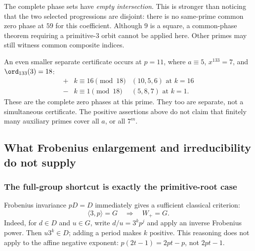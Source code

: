 \documentclass[11pt,a4paper]{article}
\theoremstyle{definition}\newtheorem{definition}[theorem]{Definition}
\theoremstyle{remark}\newtheorem{remark}[theorem]{Remark}
\begin{document}
The complete phase sets have \emph{empty intersection}. This is stronger
than noticing that the two selected progressions are disjoint: there is no
same-prime common zero phase at $59$ for this coefficient. Although $9$ is
a square, a common-phase theorem requiring a primitive-$3$ orbit cannot
be applied here. Other primes may still witness common composite indices.

An even smaller separate certificate occurs at $p=11$, where
$a\equiv5$, $x^{133}=7$, and $\ord_{133}(3)=18$:
\[
 \begin{array}{c|c|c}
 +&k\equiv16\pmod{18}&(10,5,6)\text{ at }k=16\\
 -&k\equiv1\pmod{18}&(5,8,7)\text{ at }k=1.
 \end{array}
\]
These are the complete zero phases at this prime. They too are separate,
not a simultaneous certificate. The positive assertions above do not
claim that finitely many auxiliary primes cover all $a$, or all $7^m$.

\subsection{What Frobenius enlargement and irreducibility do not supply}

\subsubsection{The full-group shortcut is exactly the primitive-root case}

Frobenius invariance $pD=D$ immediately gives a sufficient classical
criterion:
\begin{equation}\label{R16:eq:fullgroup}
 \langle3,p\rangle=G\quad\Longrightarrow\quad W_+=G.
\end{equation}
Indeed, for $d\in D$ and $u\in G$, write $d/u=3^kp^j$ and apply an
inverse Frobenius power. Then $u3^k\in D$; adding a period makes $k$
positive. This reasoning does not apply to the affine negative exponent:
$p(2t-1)=2pt-p$, not $2pt-1$.
\end{document}

